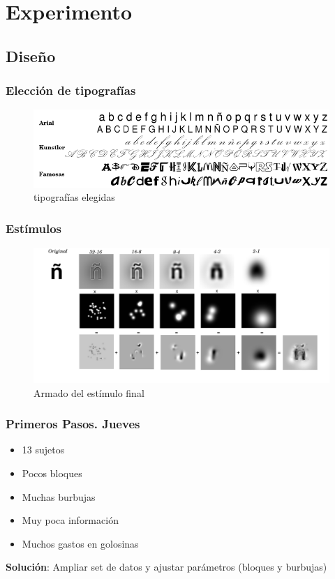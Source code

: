 \documentclass{beamer}
\begin{document}
\section{Experimento}
\subsection{Diseño}

\begin{frame}
\frametitle{Elecci\'on de tipograf\'ias}
\begin{figure}
\includegraphics[width=\textwidth]{graficos/letras.png}
\caption{tipograf\'ias elegidas}
\end{figure}
\end{frame}

\begin{frame}
\frametitle{Est\'imulos}
\begin{figure}
 \includegraphics[width=\textwidth]{graficos/estimulofinal.png}
\caption{Armado del est\'imulo final}
\end{figure}
\end{frame}

\begin{frame}
\frametitle{Primeros Pasos. Jueves}
\begin{itemize}
\item 13 sujetos
 \item Pocos bloques
\item Muchas burbujas
\item Muy poca información
\item Muchos gastos en golosinas
\end{itemize}
\textbf{Solución}: Ampliar set de datos y ajustar parámetros (bloques y burbujas)
\end{frame}
\end{document}
